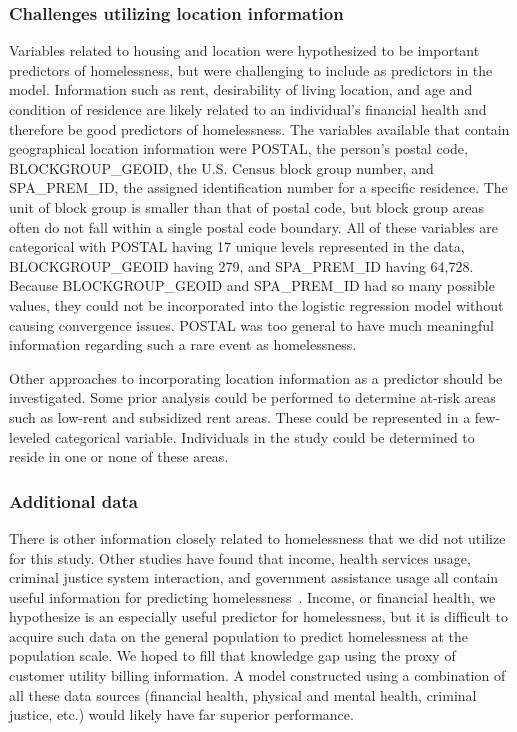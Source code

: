 \documentclass[10pt,letterpaper]{article}
\begin{document}
\subsubsection*{Challenges utilizing location information}
Variables related to housing and location were hypothesized to be important predictors of homelessness, but were challenging to include as predictors in the model. Information such as rent, desirability of living location, and age and condition of residence are likely related to an individual's financial health and therefore be good predictors of homelessness. The variables available that contain geographical location information were POSTAL, the person's postal code, BLOCKGROUP\_GEOID, the U.S. Census block group number, and SPA\_PREM\_ID, the assigned identification number for a specific residence. The unit of block group is smaller than that of postal code, but block group areas often do not fall within a single postal code boundary. All of these variables are categorical with POSTAL having 17 unique levels represented in the data, BLOCKGROUP\_GEOID having 279, and SPA\_PREM\_ID having 64,728. Because BLOCKGROUP\_GEOID and SPA\_PREM\_ID had so many possible values, they could not be incorporated into the logistic regression model without causing convergence issues. POSTAL was too general to have much meaningful information regarding such a rare event as homelessness. 

Other approaches to incorporating location information as a predictor should be investigated. Some prior analysis could be performed to determine at-risk areas such as low-rent and subsidized rent areas. These could be represented in a few-leveled categorical variable. Individuals in the study could be determined to reside in one or none of these areas.

\subsubsection*{Additional data}
There is other information closely related to homelessness that we did not utilize for this study. Other studies have found that income, health services usage, criminal justice system interaction, and government assistance usage all contain useful information for predicting homelessness~\cite{byrne2020classification,flaming2011crisis,hong2018applications,shinn2013efficient,vanberlo2021interpretable}. Income, or financial health, we hypothesize is an especially useful predictor for homelessness, but it is difficult to acquire such data on the general population to predict homelessness at the population scale. We hoped to fill that knowledge gap using the proxy of customer utility billing information. A model constructed using a combination of all these data sources (financial health, physical and mental health, criminal justice, etc.) would likely have far superior performance. 
\end{document}
